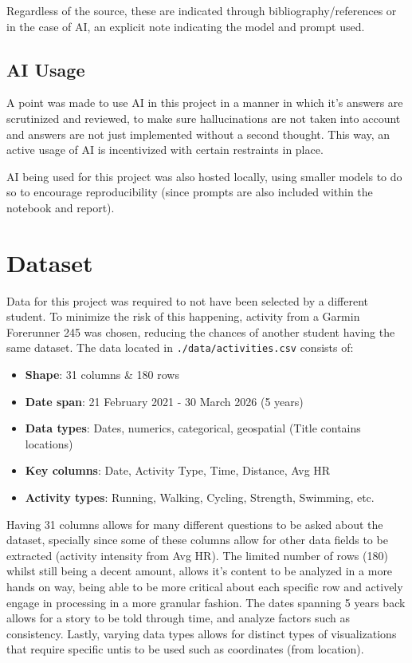 \documentclass[a4paper,11pt]{article}
\begin{document}
\par
Regardless of the source, these are indicated through bibliography/references
or in the case of AI, an explicit note indicating the model and prompt used.

\subsection{AI Usage}

\par
A point was made to use AI in this project in a manner in which it's answers
are scrutinized and reviewed, to make sure hallucinations are not taken into
account and answers are not just implemented without a second thought. This
way, an active usage of AI is incentivized with certain restraints in place.

\par
AI being used for this project was also hosted locally, using smaller models to
do so to encourage reproducibility (since prompts are also included within
the notebook and report).

\section{Dataset}

\par
Data for this project was required to not have been selected by a different
student. To minimize the risk of this happening, activity from a Garmin
Forerunner 245 was chosen, reducing the chances of another student having the
same dataset. The data located in \texttt{./data/activities.csv} consists of:

\begin{itemize}
	\item \textbf{Shape}: 31 columns \& 180 rows
	\item \textbf{Date span}: 21 February 2021 - 30 March 2026 (5 years)
	\item \textbf{Data types}: Dates, numerics, categorical, geospatial (Title
	      contains locations)
	\item \textbf{Key columns}: Date, Activity Type, Time, Distance, Avg HR
	\item \textbf{Activity types}: Running, Walking, Cycling, Strength, Swimming,
	      etc.
\end{itemize}

\par
Having 31 columns allows for many different questions to be asked about the
dataset, specially since some of these columns allow for other data fields to
be extracted (activity intensity from Avg HR). The limited number of rows (180)
whilst still being a decent amount, allows it's content to be analyzed in a
more hands on way, being able to be more critical about each specific row and
actively engage in processing in a more granular fashion. The dates spanning 5
years back allows for a story to be told through time, and analyze factors
such as consistency. Lastly, varying data types allows for distinct types of
visualizations that require specific untis to be used such as coordinates
(from location).
\end{document}
